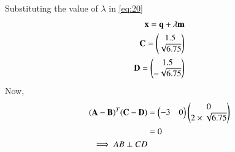 \documentclass[journal,12pt,twocolumn]{IEEEtran}
\begin{document}
Substituting the value of $\lambda$ in \eqref{eq:20}
\begin{align}
\mathbf{x}=\mathbf{q}+\lambda\mathbf{m}\\
\mathbf{C}=\begin{pmatrix}1.5\\\sqrt{6.75}\end{pmatrix}\\
\mathbf{D}=\begin{pmatrix}1.5\\-\sqrt{6.75}\end{pmatrix}
\end{align} 
Now,
\begin{align}
(\mathbf{A}-\mathbf{B})^T(\mathbf{C}-\mathbf{D})
&=\begin{pmatrix}-3&0\end{pmatrix}\begin{pmatrix}0\\2\times\sqrt{6.75}\end{pmatrix}
\\
&=0
\\
\implies AB\perp CD
\end{align}
\end{document}
